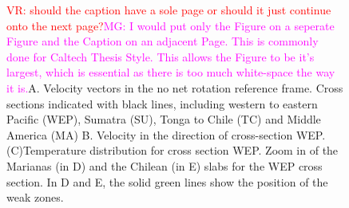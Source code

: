 \documentclass[12pt]{article}
\newcommand{\mgnote}[1]{\textcolor{magenta}{MG: #1}}
\newcommand{\vrnote}[1]{\textcolor{red}{VR: #1}}
\begin{document}
{\begin{figure}[hbtp]
\centering
{}

\label{fig:xsection2sumatra}
\end{figure}

\begin{figure}[hbtp]
\centering

\caption{\vrnote{should the caption have a sole page or should it just continue onto the next page?}\mgnote{I would put only the Figure on a seperate Figure and the Caption on an adjacent Page. This is commonly done for Caltech Thesis Style. This allows the Figure to be it's largest, which is essential as there is too much white-space the way it is.}A. Velocity vectors in the no net rotation reference frame. Cross sections indicated with black lines, including western to eastern Pacific (WEP), Sumatra (SU), Tonga to Chile (TC) and Middle America (MA) B. Velocity in the direction of cross-section WEP.(C)Temperature distribution for cross section WEP. Zoom in of the Marianas (in D) and the Chilean (in E) slabs for the WEP cross section. In D and E, the solid green lines show the position of the weak zones.}
\label{fig:caption}
\end{figure}



}
\end{document}
